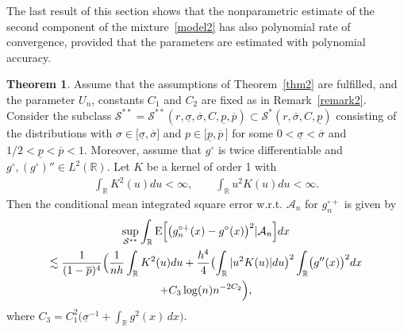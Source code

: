 \documentclass[a4paper,11pt]{article}
\theoremstyle{definition}
\newcommand{\R}{{\mathbb{R}}}
\newcommand{\1}{\mathbb{I}}
\newcommand{\A}{\mathscr{A}}
\renewcommand{\A}{\mathcal{A}}
\newcommand{\E}{{\mathrm E}}
\def\R{\mathbb{R}}
\newtheorem{thm}{Theorem}
\theoremstyle{remark}
\begin{document}
The last result of this section shows that the nonparametric estimate of the second component of the mixture~\eqref{model2} has also polynomial rate of convergence, provided that the parameters are estimated with polynomial accuracy.
\begin{thm}\label{thm3}
Assume that the assumptions of Theorem~\ref{thm2} are fulfilled, and the parameter \(U_n\), constants $C_1$ and \(C_2\) are fixed as in  Remark~\ref{remark2}. Consider the subclass \(\mathcal{S}^{**}=\mathcal{S}^{**}(r, \underline{\sigma}, \overline{\sigma}, C, \underline{p}, \overline{p}) \subset \mathcal{S}^*(r, \bar{\sigma}, C, \underline{p}) \) consisting of the distributions with $\sigma \in \bigl[\underline{\sigma}, \overline{\sigma}\bigr]$  and $p \in \bigl[ \underline{p}, \overline{p}\,\bigr]$ for some \(0<\underline{\sigma}<\overline{\sigma}\) and $1/2 < \underline{p} < \overline{p} < 1$. Moreover, assume that $g^\circ$ is twice differentiable and  $g^\circ, (g^\circ)'' \in L^2(\R)$. Let \(K\) be a kernel of order 1 with
\begin{eqnarray*}
\int_\R K^2(u)du < \infty, \qquad \int_\R u^2 K(u) du <\infty.
\end{eqnarray*}
Then the conditional mean integrated square error w.r.t. $\A_n$ for $g_n^{\circ+}$ is given by
\begin{multline}\label{stat}
\sup_{\mathcal{S}^{**}}  \int_{\R} \E \Bigl[ \bigl(g^{\circ+}_{n} (x) - g^{\circ}(x)\bigr)^2 | \A_n\Bigr] dx  \\ 
    \lesssim \frac{1}{(1-\overline{p})^4}\Bigl(\frac{1}{nh}\int_{\R} K^2(u)du + \frac{h^4}{4}\bigl(\int_{\R}|u^2K(u)|du\bigr)^2 
    \int_\R \bigl( g''(x) \bigr)^2 dx
    \\
    + C_3 \log(n) n^{-2 C_2}\Bigr),
\end{multline}
where $C_3 =  C^2_1\bigl( 
\underline{\sigma}^{-1} + \int_{\R} g^2(x) \, dx
\bigr).$
\end{thm}
\end{document}
